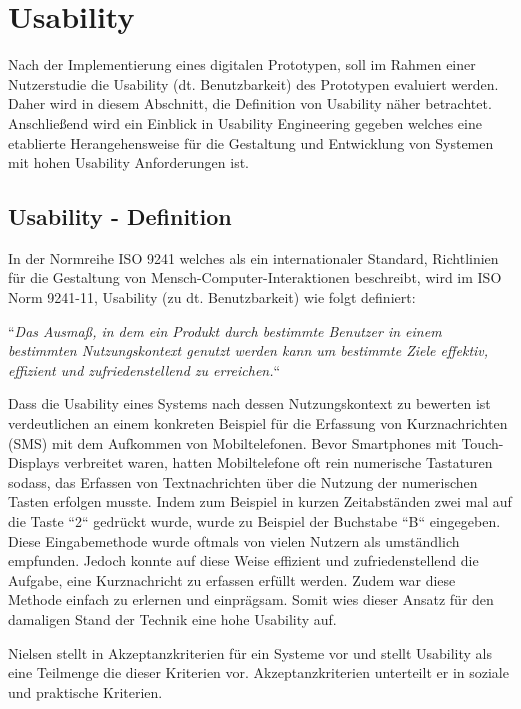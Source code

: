 \section{Usability}

Nach der Implementierung eines digitalen Prototypen, soll im Rahmen einer Nutzerstudie die Usability (dt. Benutzbarkeit) des Prototypen evaluiert werden.
Daher wird in diesem Abschnitt, die Definition von Usability näher betrachtet. Anschließend wird ein Einblick in Usability Engineering gegeben welches eine etablierte Herangehensweise für
die Gestaltung und Entwicklung von Systemen mit hohen Usability Anforderungen ist. 

\subsection{Usability - Definition} \label{UsaDef}

In der Normreihe ISO 9241 welches als ein internationaler Standard, Richtlinien für die Gestaltung von Mensch-Computer-Interaktionen beschreibt, wird im ISO Norm 9241-11,  Usability (zu dt. Benutzbarkeit) wie folgt definiert:

``\textit{Das Ausmaß, in dem ein Produkt durch bestimmte Benutzer in einem bestimmten Nutzungskontext genutzt werden kann um bestimmte Ziele effektiv, effizient und zufriedenstellend zu erreichen.}``

Dass die Usability eines Systems nach dessen Nutzungskontext zu bewerten ist verdeutlichen \cite[S.~10]{MichaelRichter2016} an einem konkreten Beispiel für die Erfassung 
von Kurznachrichten (SMS) mit dem Aufkommen von Mobiltelefonen. Bevor Smartphones mit Touch-Displays verbreitet waren, hatten Mobiltelefone oft rein numerische Tastaturen sodass, das Erfassen 
von Textnachrichten über die Nutzung der numerischen Tasten erfolgen musste. Indem zum Beispiel in kurzen Zeitabständen zwei mal auf die Taste ``2`` gedrückt wurde, wurde zu Beispiel der Buchstabe 
``B`` eingegeben. Diese Eingabemethode wurde oftmals von vielen Nutzern als umständlich empfunden. Jedoch konnte auf diese Weise effizient und zufriedenstellend die Aufgabe, eine Kurznachricht 
zu erfassen erfüllt werden. Zudem war diese Methode einfach zu erlernen und einprägsam. Somit wies dieser Ansatz für den damaligen Stand der Technik eine hohe Usability auf. 

Nielsen stellt in \cite[S.~25]{Nielsen1994} Akzeptanzkriterien für ein Systeme vor und stellt Usability als eine Teilmenge die dieser Kriterien vor.
Akzeptanzkriterien unterteilt er in soziale und praktische Kriterien.

